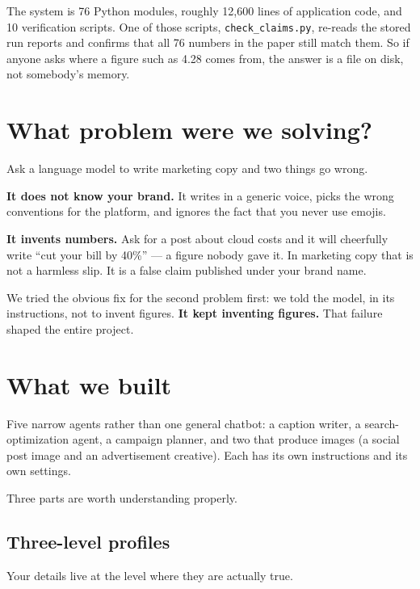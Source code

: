 \documentclass[11pt]{article}
\begin{document}
The system is 76 Python modules, roughly 12{,}600 lines of application code, and
10 verification scripts. One of those scripts, \texttt{check\_claims.py},
re-reads the stored run reports and confirms that all 76 numbers in the paper
still match them. So if anyone asks where a figure such as 4.28 comes from, the
answer is a file on disk, not somebody's memory.

\section{What problem were we solving?}

Ask a language model to write marketing copy and two things go wrong.

\textbf{It does not know your brand.} It writes in a generic voice, picks the
wrong conventions for the platform, and ignores the fact that you never use
emojis.

\textbf{It invents numbers.} Ask for a post about cloud costs and it will
cheerfully write ``cut your bill by 40\%'' --- a figure nobody gave it. In
marketing copy that is not a harmless slip. It is a false claim published under
your brand name.

\begin{callout}
We tried the obvious fix for the second problem first: we told the model, in its
instructions, not to invent figures. \textbf{It kept inventing figures.} That
failure shaped the entire project.
\end{callout}

\section{What we built}

Five narrow agents rather than one general chatbot: a caption writer, a
search-optimization agent, a campaign planner, and two that produce images (a
social post image and an advertisement creative). Each has its own instructions
and its own settings.

Three parts are worth understanding properly.

\subsection{Three-level profiles}

Your details live at the level where they are actually true.
\end{document}
